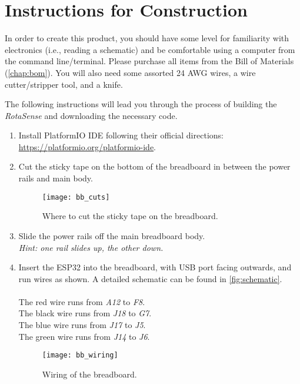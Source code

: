 \chapter{Instructions for Construction}
\label{chap:construction}

In order to create this product, you should have some level for familiarity
with electronics (i.e., reading a schematic) and be comfortable using a
computer from the command line/terminal. Please purchase all items from the
Bill of Materials (\autoref{chap:bom}). You will also need some assorted 24 AWG
wires, a wire cutter/stripper tool, and a knife.

The following instructions will lead you through the process of building the
\textit{RotaSense} and downloading the necessary code.

\begin{enumerate}
\item Install PlatformIO IDE following their official directions:
  \href{https://platformio.org/platformio-ide}{https://platformio.org/platformio-ide}.
  
\item Cut the sticky tape on the bottom of the breadboard in between the power
  rails and main body.
  \begin{figure}[H]
    \centering
    \texttt{[image: bb\_cuts]}
    \caption[Breadboard backing cuts]{Where to cut the sticky tape on the
      breadboard.}
    \label{fig:bb-cuts}
  \end{figure}
  
\item Slide the power rails off the main breadboard body.\\
  \textit{Hint: one rail slides up, the other down.}
  
\item Insert the ESP32 into the breadboard, with USB port facing outwards, and
  run wires as shown. A detailed schematic can be found in \autoref{fig:schematic}.\\
  \\
  The red wire runs from \textit{A12} to \textit{F8}.\\
  The black wire runs from \textit{J18} to \textit{G7}.\\
  The blue wire runs from \textit{J17} to \textit{J5}.\\
  The green wire runs from \textit{J14} to \textit{J6}.
  \begin{figure}[H]
    \centering
    \texttt{[image: bb\_wiring]}
    \caption[Breadboard wiring]{Wiring of the breadboard.}
  \end{figure}
  

\end{enumerate}
